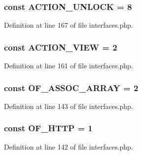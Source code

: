 \hypertarget{interfaceIXLUIHelper_ae24b4d0d3bf45c296468bccbfb12a13b}{
\subsubsection[{ACTION\_\-UNLOCK}]{\setlength{\rightskip}{0pt plus 5cm}const {\bf ACTION\_\-UNLOCK} = 8}}
\label{interfaceIXLUIHelper_ae24b4d0d3bf45c296468bccbfb12a13b}


Definition at line 167 of file interfaces.php.

\hypertarget{interfaceIXLUIHelper_a264a8a0ead2c258c6ad9ce0f0968cd1b}{
\subsubsection[{ACTION\_\-VIEW}]{\setlength{\rightskip}{0pt plus 5cm}const {\bf ACTION\_\-VIEW} = 2}}
\label{interfaceIXLUIHelper_a264a8a0ead2c258c6ad9ce0f0968cd1b}


Definition at line 161 of file interfaces.php.

\hypertarget{interfaceIXLUIHelper_a9976081cc6341d651113d98adf880a7c}{
\subsubsection[{OF\_\-ASSOC\_\-ARRAY}]{\setlength{\rightskip}{0pt plus 5cm}const {\bf OF\_\-ASSOC\_\-ARRAY} = 2}}
\label{interfaceIXLUIHelper_a9976081cc6341d651113d98adf880a7c}


Definition at line 143 of file interfaces.php.

\hypertarget{interfaceIXLUIHelper_ad861d7e1882caed33177c62354962537}{
\subsubsection[{OF\_\-HTTP}]{\setlength{\rightskip}{0pt plus 5cm}const {\bf OF\_\-HTTP} = 1}}
\label{interfaceIXLUIHelper_ad861d7e1882caed33177c62354962537}


Definition at line 142 of file interfaces.php.

